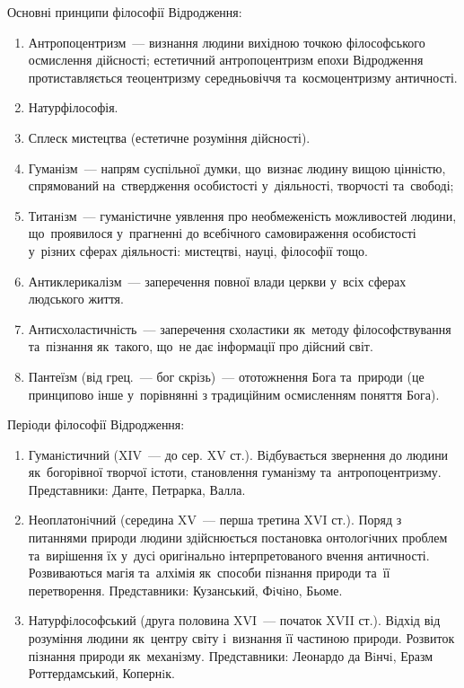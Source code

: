 \documentclass[a5paper,oneside,DIV=12,12pt,headings=small]{scrartcl}
\begin{document}
		Основні принципи філософії Відродження:
		\begin{enumerate}
			\item Антропоцентризм~— визнання людини вихідною точкою філософського осмислення дійсності; естетичний антропоцентризм епохи Відродження протиставляється теоцентризму середньовіччя та~космоцентризму античності.
			\item Натурфілософія.
			\item Сплеск мистецтва (естетичне розуміння дійсності).
			\item Гуманізм~— напрям суспільної думки, що~визнає людину вищою цінністю, спрямований на~ствердження особистості у~діяльності, творчості та~свободі;
			\item Титанiзм~— гуманістичне уявлення про необмеженість можливостей людини, що~проявилося у~прагненні до всебічного самовираження особистості у~різних сферах діяльності: мистецтві, науці, філософії тощо.
			\item Антиклерикалізм~— заперечення повної влади церкви у~всіх сферах людського життя.
			\item Антисхоластичність~— заперечення схоластики як~методу філософствування та~пізнання як~такого, що~не дає інформації про дійсний світ.
			\item Пантеїзм (від грец.~— бог скрізь)~— ототожнення Бога та~природи (це принципово інше у~порівнянні з традиційним осмисленням поняття Бога).
		\end{enumerate}
		
		Періоди філософії Відродження:
		\begin{enumerate}
			\item Гуманiстичний (XIV~— до сер. XV ст.). Відбувається звернення до людини як~богорівної творчої істоти, становлення гуманізму та~антропоцентризму. Представники: Данте, Петрарка, Валла.
			\item Неоплатонiчний (середина XV~— перша третина XVI ст.). Поряд з питаннями природи людини здійснюється постановка онтологiчних проблем та~вирішення їх у~дусі оригінально інтерпретованого вчення античності. Розвиваються магія та~алхімія як~способи пізнання природи та~її перетворення. Представники: Кузанський, Фiчiно, Бьоме.
			\item Натурфiлософський (друга половина XVI~— початок XVII ст.). Відхід від розуміння людини як~центру світу і~визнання її частиною природи. Розвиток пізнання природи як~механізму. Представники: Леонардо да Вiнчi, Еразм Роттердамський, Копернiк.
		\end{enumerate}
		
\end{document}
